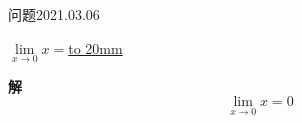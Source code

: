 \begin{mybox}{问题2021.03.06}
	
	\qquad $\lim\limits_{x \to 0} x=$\underline{\hbox to 20mm{}}
\end{mybox}
\noindent
\textbf{解}
$$\lim\limits_{x \to 0} x = 0$$